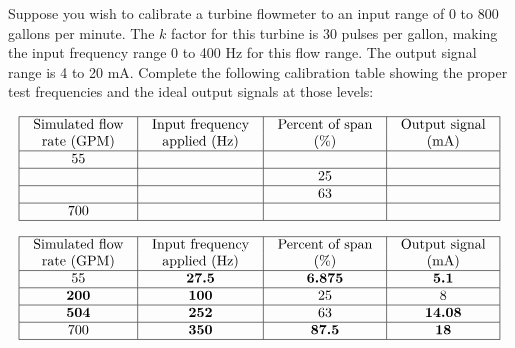 

Suppose you wish to calibrate a turbine flowmeter to an input range of 0 to 800 gallons per minute.  The $k$ factor for this turbine is 30 pulses per gallon, making the input frequency range 0 to 400 Hz for this flow range.  The output signal range is 4 to 20 mA.  Complete the following calibration table showing the proper test frequencies and the ideal output signals at those levels:


$$\vbox{\offinterlineskip
\halign{\strut
\vrule \quad\hfil # \ \hfil & 
\vrule \quad\hfil # \ \hfil & 
\vrule \quad\hfil # \ \hfil & 
\vrule \quad\hfil # \ \hfil \vrule \cr
\noalign{\hrule}
%
Simulated flow & Input frequency & Percent of span & Output signal \cr
%
rate (GPM) & applied (Hz) & (\%) & (mA) \cr
%
\noalign{\hrule}
%
55 &  &  &  \cr
%
\noalign{\hrule}
%
 &  & 25 &  \cr
%
\noalign{\hrule}
%
 &  & 63 &  \cr
%
\noalign{\hrule}
%
700 &  &  &  \cr
%
\noalign{\hrule}
} %
}$$ %








$$\vbox{\offinterlineskip
\halign{\strut
\vrule \quad\hfil # \ \hfil & 
\vrule \quad\hfil # \ \hfil & 
\vrule \quad\hfil # \ \hfil & 
\vrule \quad\hfil # \ \hfil \vrule \cr
\noalign{\hrule}
%
Simulated flow & Input frequency & Percent of span & Output signal \cr
%
rate (GPM) & applied (Hz) & (\%) & (mA) \cr
%
\noalign{\hrule}
%
55 & {\bf 27.5} & {\bf 6.875} & {\bf 5.1} \cr
%
\noalign{\hrule}
%
{\bf 200} & {\bf 100} & 25 & 8 \cr
%
\noalign{\hrule}
%
{\bf 504} & {\bf 252} & 63 & {\bf 14.08} \cr
%
\noalign{\hrule}
%
700 & {\bf 350} & {\bf 87.5} & {\bf 18} \cr
%
\noalign{\hrule}
} %
}$$ %










